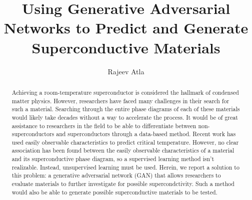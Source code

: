 \documentclass{article}
\title{Using Generative Adversarial Networks to Predict and Generate Superconductive Materials}
\author{Rajeev Atla}
\date{}
\begin{document}
\maketitle

\begin{abstract}
Achieving a room-temperature superconductor is considered the hallmark of condensed matter physics.
However, researchers have faced many challenges in their search for such a material.
Searching through the entire phase diagrams of each of these materials would likely take decades without a way to accelerate the process.
It would be of great assistance to researchers in the field to be able to differentiate between non-superconductors and superconductors through a data-based method.
Recent work has used easily observable characteristics to predict critical temperature.
However, no clear association has been found between the easily observable characteristics of a material and its superconductive phase diagram, so a supervised learning method isn't realizable.
Instead, unsupervised learning must be used.
Herein, we report a solution to this problem: a generative adversarial network (GAN) that allows researchers to evaluate materials to further investigate for possible supercondctivity.
Such a method would also be able to generate possible superconductive materials to be tested.
\end{abstract}
\end{document}
